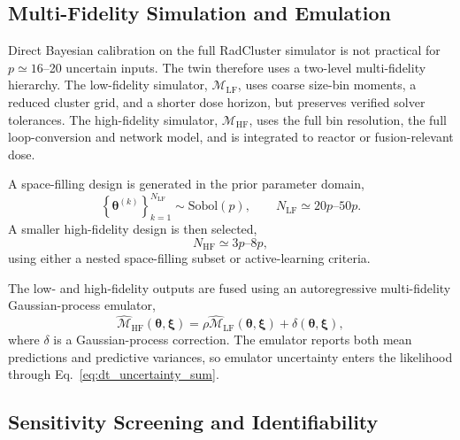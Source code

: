\subsection{Multi-Fidelity Simulation and Emulation}
\label{app:dt_multifidelity}

Direct Bayesian calibration on the full RadCluster simulator is not practical
for $p\simeq16$--20 uncertain inputs.  The twin therefore uses a two-level
multi-fidelity hierarchy.  The low-fidelity simulator,
$\mathcal{M}_{\mathrm{LF}}$, uses coarse size-bin moments, a reduced cluster grid,
and a shorter dose horizon, but preserves verified solver tolerances.  The
high-fidelity simulator, $\mathcal{M}_{\mathrm{HF}}$, uses the full bin resolution,
the full loop-conversion and network model, and is integrated to reactor or
fusion-relevant dose.

A space-filling design is generated in the prior parameter domain,
\begin{equation}
    \left\{
      \boldsymbol{\theta}^{(k)}
    \right\}_{k=1}^{N_{\mathrm{LF}}}
    \sim
    \mathrm{Sobol}(p),
    \qquad
    N_{\mathrm{LF}}\simeq 20p\text{--}50p .
\end{equation}
A smaller high-fidelity design is then selected,
\begin{equation}
    N_{\mathrm{HF}}\simeq 3p\text{--}8p,
\end{equation}
using either a nested space-filling subset or active-learning criteria.

The low- and high-fidelity outputs are fused using an autoregressive
multi-fidelity Gaussian-process emulator,
\begin{equation}
    \widehat{\mathcal{M}}_{\mathrm{HF}}(\boldsymbol{\theta},\boldsymbol{\xi})
    =
    \rho
    \widehat{\mathcal{M}}_{\mathrm{LF}}(\boldsymbol{\theta},\boldsymbol{\xi})
    +
    \delta(\boldsymbol{\theta},\boldsymbol{\xi}),
    \label{eq:dt_multifidelity_gp}
\end{equation}
where $\delta$ is a Gaussian-process correction.  The emulator reports both
mean predictions and predictive variances, so emulator uncertainty enters the
likelihood through Eq.~\eqref{eq:dt_uncertainty_sum}.

\subsection{Sensitivity Screening and Identifiability}
\label{app:dt_sensitivity}


